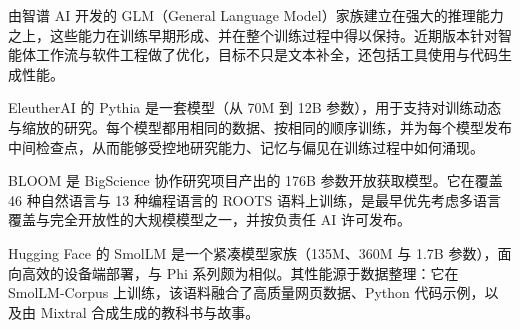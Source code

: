 \begin{description}[font=\bfseries]
    \item[GLM] \citep{glm5team2026glm5vibecodingagentic} 由智谱 AI 开发的 GLM（General Language Model）家族建立在强大的推理能力之上，这些能力在训练早期形成、并在整个训练过程中得以保持。近期版本针对智能体工作流与软件工程做了优化，目标不只是文本补全，还包括工具使用与代码生成性能。
    \item[Pythia] \citep{biderman2023pythia} EleutherAI 的 Pythia 是一套模型（从 70M 到 12B 参数），用于支持对训练动态与缩放的研究。每个模型都用相同的数据、按相同的顺序训练，并为每个模型发布中间检查点，从而能够受控地研究能力、记忆与偏见在训练过程中如何涌现。
    \item[BLOOM] \citep{workshop2023bloom176bparameteropenaccessmultilingual} BLOOM 是 BigScience 协作研究项目产出的 176B 参数开放获取模型。它在覆盖 46 种自然语言与 13 种编程语言的 ROOTS 语料上训练，是最早优先考虑多语言覆盖与完全开放性的大规模模型之一，并按负责任 AI 许可发布。
    \item[SmolLM] \citep{allal2025smollm} Hugging Face 的 SmolLM 是一个紧凑模型家族（135M、360M 与 1.7B 参数），面向高效的设备端部署，与 Phi 系列颇为相似。其性能源于数据整理：它在 SmolLM-Corpus 上训练，该语料融合了高质量网页数据、Python 代码示例，以及由 Mixtral 合成生成的教科书与故事。
\end{description}




